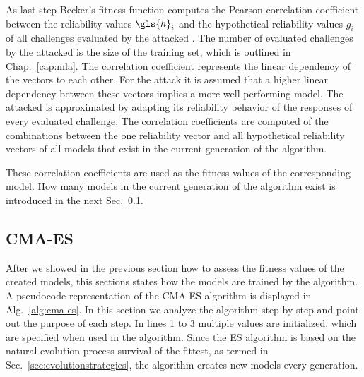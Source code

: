 As last step Becker's fitness function computes the Pearson correlation coefficient between the reliability values $\gls{h}_i$ and the hypothetical reliability values $g_i$ of all challenges evaluated by the attacked \puf.
The number of evaluated challenges by the attacked \puf is the size of the training set, which is outlined in Chap.\ \ref{cap:mla}.
The correlation coefficient represents the linear dependency of the vectors to each other.
For the attack it is assumed that a higher linear dependency between these vectors implies a more well performing model. %
The attacked \puf is approximated by adapting its reliability behavior of the responses of every evaluated challenge.
The correlation coefficients are computed of the combinations between the one reliability vector and all hypothetical reliability vectors of all models that exist in the current generation of the algorithm.

These correlation coefficients are used as the fitness values of the corresponding model.
How many models in the current generation of the algorithm exist is introduced in the next Sec.\ \ref{sec:cma-esdesign}.


\subsection{CMA-ES}
\label{sec:cma-esdesign}

After we showed in the previous section how to assess the fitness values of the created models, this sections states how the models are trained by the algorithm.
A pseudocode representation of the \ac{CMA-ES} algorithm is displayed in Alg.\ \ref{alg:cma-es}.
In this section we analyze the algorithm step by step and point out the purpose of each step. %
In lines 1 to 3 multiple values are initialized, which are specified when used in the algorithm.
Since the \ac{ES} algorithm is based on the natural evolution process survival of the fittest, as termed in Sec.\ \ref{sec:evolutionstrategies}, the algorithm creates new models every generation. %

